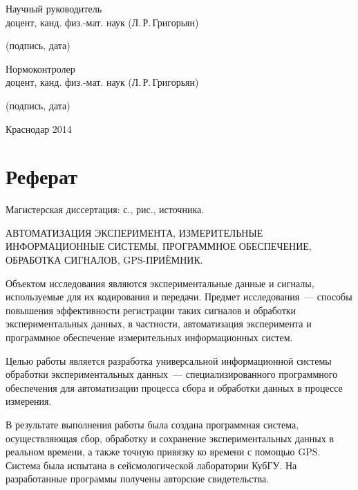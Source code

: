 \documentclass[a4paper, 14pt, titlepage]{extarticle}
\newcommand\sectiontoc[1]{\section*{\centering #1}\addcontentsline{toc}{section}{#1}}
\let\oldsection\section
\renewcommand{\section}{\newpage\oldsection}
\begin{document}
\begin {center}
\begin{flushleft}
    Научный руководитель\\
    доцент, канд. физ.-мат. наук \hrulefill{} (Л.\,Р.\,Григорьян)
    \\[-3mm]{\footnotesize\centering (подпись, дата)\par}

    Нормоконтролер\\
    доцент, канд. физ.-мат. наук \hrulefill{} (Л.\,Р.\,Григорьян)
    \\[-3mm]{\footnotesize\centering (подпись, дата)\par}
  \end{flushleft}

  \vfill

  Краснодар 2014
  \end {center}

  \sectiontoc{Реферат}

  Магистерская диссертация:  с., %
   рис.,  источника.

  АВТОМАТИЗАЦИЯ ЭКСПЕРИМЕНТА, ИЗМЕРИТЕЛЬНЫЕ ИНФОРМАЦИОННЫЕ СИСТЕМЫ, ПРОГРАММНОЕ ОБЕСПЕЧЕНИЕ,
  ОБРАБОТКА СИГНАЛОВ, GPS-ПРИЁМНИК.

  Объектом исследования являются экспериментальные данные и сигналы, используемые для их кодирования
  и передачи. Предмет исследования~--- способы повышения эффективности регистрации таких сигналов и
  обработки экспериментальных данных, в частности, автоматизация эксперимента и программное
  обеспечение измерительных информационных систем.

  Целью работы является разработка универсальной информационной системы обработки экспериментальных
  данных~--- специализированного программного обеспечения для автоматизации процесса сбора и
  обработки данных в процессе измерения.

  В результате выполнения работы была создана программная система, осуществляющая сбор, обработку и
  сохранение экспериментальных данных в реальном времени, а также точную привязку ко времени с
  помощью GPS. Система была испытана в сейсмологической лаборатории КубГУ. На разработанные
  программы получены авторские свидетельства.



    \clearpage
    \tableofcontents
\end{document}
